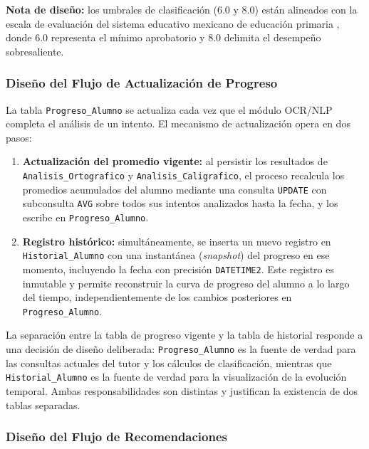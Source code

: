 \noindent\textbf{Nota de diseño:} los umbrales de clasificación (6.0 y
8.0) están alineados con la escala de evaluación del sistema educativo
mexicano de educación primaria \cite{sep2011guia}, donde 6.0 representa
el mínimo aprobatorio y 8.0 delimita el desempeño sobresaliente.

\subsubsection{Diseño del Flujo de Actualización de Progreso}

La tabla \texttt{Progreso\_Alumno} se actualiza cada vez que el módulo
OCR/NLP completa el análisis de un intento. El mecanismo de actualización
opera en dos pasos:

\begin{enumerate}
    \item \textbf{Actualización del promedio vigente:} al persistir los
    resultados de \texttt{Analisis\_Ortografico} y
    \texttt{Analisis\_Caligrafico}, el proceso recalcula los promedios
    acumulados del alumno mediante una consulta \texttt{UPDATE} con
    subconsulta \texttt{AVG} sobre todos sus intentos analizados hasta
    la fecha, y los escribe en \texttt{Progreso\_Alumno}.

    \item \textbf{Registro histórico:} simultáneamente, se inserta un
    nuevo registro en \texttt{Historial\_Alumno} con una instantánea
    (\textit{snapshot}) del progreso en ese momento, incluyendo la fecha
    con precisión \texttt{DATETIME2}. Este registro es inmutable y
    permite reconstruir la curva de progreso del alumno a lo largo del
    tiempo, independientemente de los cambios posteriores en
    \texttt{Progreso\_Alumno}.
\end{enumerate}

La separación entre la tabla de progreso vigente y la tabla de historial
responde a una decisión de diseño deliberada: \texttt{Progreso\_Alumno}
es la fuente de verdad para las consultas actuales del tutor y los
cálculos de clasificación, mientras que \texttt{Historial\_Alumno}
es la fuente de verdad para la visualización de la evolución temporal.
Ambas responsabilidades son distintas y justifican la existencia de dos
tablas separadas.

\subsubsection{Diseño del Flujo de Recomendaciones}

